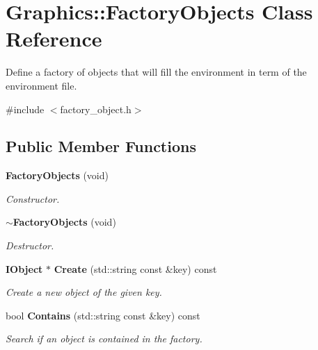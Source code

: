 \section{Graphics\+:\+:Factory\+Objects Class Reference}
\label{class_graphics_1_1_factory_objects}


Define a factory of objects that will fill the environment in term of the environment file.  




{\ttfamily \#include $<$factory\+\_\+object.\+h$>$}

\subsection*{Public Member Functions}
\begin{DoxyCompactItemize}
\item 
{\bf Factory\+Objects} (void)\label{class_graphics_1_1_factory_objects_a60218384f3ca027d24937a9994966ea6}

\begin{DoxyCompactList}\small\item\em Constructor. \end{DoxyCompactList}\item 
{\bf $\sim$\+Factory\+Objects} (void)\label{class_graphics_1_1_factory_objects_a89aec6a156872cf980aa49c42f25f2b5}

\begin{DoxyCompactList}\small\item\em Destructor. \end{DoxyCompactList}\item 
{\bf I\+Object} $\ast$ {\bf Create} (std\+::string const \&key) const 
\begin{DoxyCompactList}\small\item\em Create a new object of the given key. \end{DoxyCompactList}\item 
bool {\bf Contains} (std\+::string const \&key) const 
\begin{DoxyCompactList}\small\item\em Search if an object is contained in the factory. \end{DoxyCompactList}\end{DoxyCompactItemize}
